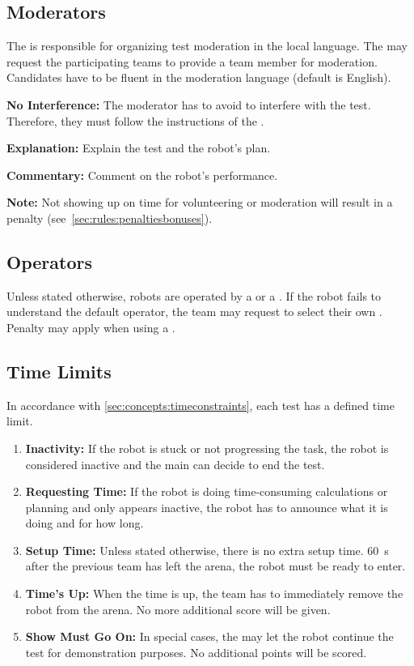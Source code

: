\subsection{Moderators}
\label{sec:rules:moderators}
The  is responsible for organizing test moderation in the local language. The  may request the participating teams to provide a team member for moderation. Candidates have to be fluent in the moderation language (default is English).
\begin{compactitem}
	\item \textbf{No Interference:} The moderator has to avoid to interfere with the test. Therefore, they must follow the instructions of the \Referees{}.
	\item \textbf{Explanation:} Explain the test and the robot's plan.
	\item \textbf{Commentary:} Comment on the robot's performance.
\end{compactitem}

\noindent \textbf{Note:} Not showing up on time for volunteering or moderation will result in a penalty (see~\ref{sec:rules:penaltiesbonuses}).

\subsection{Operators}
\label{sec:rules:operators}
Unless stated otherwise, robots are operated by a \Referee{} or a \Volunteer{}. If the robot fails to understand the default operator, the team may request to select their own \CustomOperator{}. Penalty may apply when using a \CustomOperator{}.


\subsection{Time Limits}
\label{rule:time_limits}
In accordance with \ref{sec:concepts:timeconstraints}, each test has a defined time limit.
\begin{enumerate}
	\item \textbf{Inactivity:} If the robot is stuck or not progressing the task, the robot is considered inactive and the main \Referee{} can decide to end the test. 

	\item \textbf{Requesting Time:} If the robot is doing time-consuming calculations or planning and only appears inactive, the robot has to announce what it is doing and for how long.

	\item \textbf{Setup Time:} Unless stated otherwise, there is no extra setup time. \SI{60}{\second} after the previous team has left the arena, the robot must be ready to enter. 

	\item \textbf{Time's Up:} When the time is up, the team has to immediately remove the robot from the arena.
	No more additional score will be given.

	\item \textbf{Show Must Go On:} In special cases, the \Referee{} may let the robot continue the test for demonstration purposes. No additional points will be scored.
\end{enumerate}

